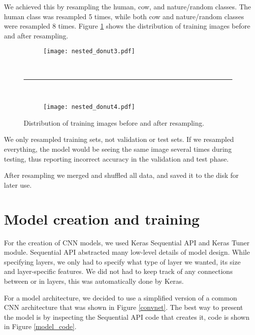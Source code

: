 
We achieved this by resampling the human, cow, and nature/random classes.
The human class was resampled 5 times, while both cow and nature/random classes were resampled 8 times.
Figure \ref{resampled} shows the distribution of training images before and after resampling.

\begin{figure}[ht] 
    \begin{subfigure}[b]{1\textwidth}
        \centering
        \texttt{[image: nested\_donut3.pdf]} 
    \end{subfigure}
    \unskip\ \hrule\ 
    \begin{subfigure}[b]{1\textwidth}
        \centering
        \texttt{[image: nested\_donut4.pdf]} 
    \end{subfigure}
    
    \caption{ Distribution of training images before and after resampling.}
    \label{resampled}
\end{figure}

We only resampled training sets, not validation or test sets.
If we resampled everything, the model would be seeing the same image several times during testing, thus reporting incorrect accuracy in the validation and test phase.

After resampling we merged and shuffled all data, and saved it to the disk for later use.


\section{ Model creation and training}\label{cnn_ref}

For the creation of CNN models, we used Keras Sequential API and Keras Tuner module.
Sequential API abstracted many low-level details of model design.
While specifying layers, we only had to specify what type of layer we wanted, its size and layer-specific features. 
We did not had to keep track of any connections between or in layers, this was automatically done by Keras.

For a model architecture, we decided to use a simplified version of a common CNN architecture that was shown in Figure \ref{convnet}.
The best way to present the model is by inspecting the Sequential API code that creates it, code is shown in Figure \ref{model_code}.

